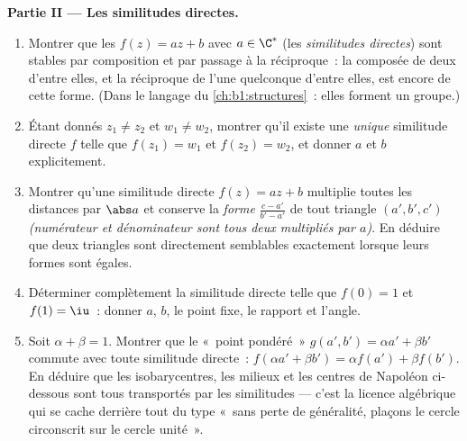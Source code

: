 \begin{problem}
\medskip
\noindent\textbf{Partie II --- Les similitudes directes.}
\begin{enumerate}[resume]
  \item Montrer que les  $f(z) = az + b$ avec $a \in
        \C^*$ (les \emph{similitudes directes}) sont stables par
        composition et par passage à la réciproque~: la composée de
        deux d'entre elles, et la réciproque de l'une quelconque
        d'entre elles, est encore de cette forme. (Dans le langage
        du \cref{ch:b1:structures}~: elles forment un groupe.)
  \item Étant donnés $z_1 \neq z_2$ et $w_1 \neq w_2$, montrer qu'il
        existe une \emph{unique} similitude directe $f$ telle que
        $f(z_1) = w_1$ et $f(z_2) = w_2$, et donner $a$ et $b$
        explicitement.
  \item Montrer qu'une similitude directe $f(z) = az + b$ multiplie
        toutes les distances par $\abs a$ et conserve la
        \emph{forme} $\frac{c - a'}{b' - a'}$ de tout triangle $(a',
        b', c')$ \emph{(numérateur et dénominateur sont tous deux
        multipliés par $a$)}. En déduire que deux triangles sont
        directement semblables exactement lorsque leurs formes sont
        égales.
  \item Déterminer complètement la similitude directe telle que
        $f(0) = 1$ et $f(1) = \iu$~: donner $a$, $b$, le point fixe,
        le rapport et l'angle.
  \item Soit $\alpha + \beta = 1$. Montrer que le «~point pondéré~»
        $g(a', b') = \alpha a' + \beta b'$ commute avec toute
        similitude directe~: $f(\alpha a' + \beta b') = \alpha f(a')
        + \beta f(b')$. En déduire que les isobarycentres, les
        milieux et les centres de Napoléon ci-dessous sont tous
        transportés par les similitudes --- c'est la licence
        algébrique qui se cache derrière tout  du type
        «~sans perte de généralité, plaçons le cercle circonscrit
        sur le cercle unité~».
\end{enumerate}


\end{problem}
